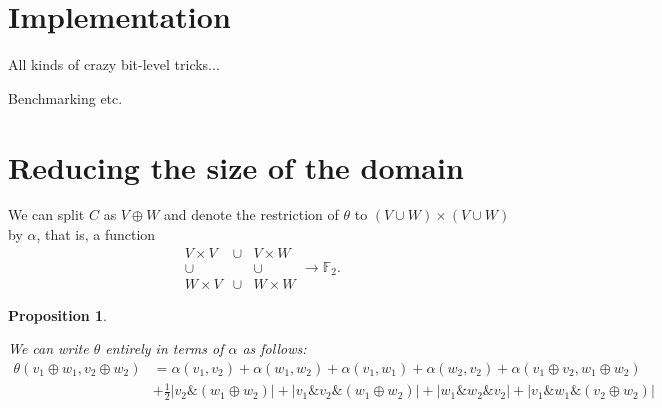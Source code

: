 \documentclass[a4paper,debug]{tufte-handout}
\theoremstyle{plain}
\newtheorem{proposition}[theorem]{Proposition}
\theoremstyle{definition}
\theoremstyle{remark}
\DeclareMathOperator{\Span}{span}
\newcommand{\F}{\mathbb{F}}
\def\And{\mathbin{\&}}
\def\Plus{\oplus}
\begin{document}


\section{Implementation}

All kinds of crazy bit-level tricks...

Benchmarking etc.

\section{Reducing the size of the domain} 
We can split $C$ as $V\oplus W$ and denote the restriction of $\theta$ to $(V\cup W)\times (V \cup W)$ by $\alpha$, that is, a function
\[
	\begin{array}{ccc}
		V\times V& \cup&V\times W\\
		\cup&&\cup\\
		W\times V&\cup &W\times W
	\end{array} \longrightarrow \F_2.
\]

\begin{proposition}\label{eq:reconstructing theta}

We can write $\theta$ entirely in terms of $\alpha$ as follows:
\begin{align*}
	\theta(v_1\Plus w_1,v_2\Plus w_2)	& = \alpha(v_1,v_2)  + \alpha(w_1,w_2) + \alpha(v_1,w_1) + \alpha(w_2,v_2) + \alpha(v_1\Plus v_2,w_1\Plus w_2)\\
							& + \frac12|v_2\And(w_1\Plus w_2)| + |v_1\And v_2 \And (w_1\Plus w_2)| + |w_1\And w_2 \And v_2| + |v_1\And w_1 \And (v_2 \Plus  w_2)| 
\end{align*}
\end{proposition}
\end{document}
